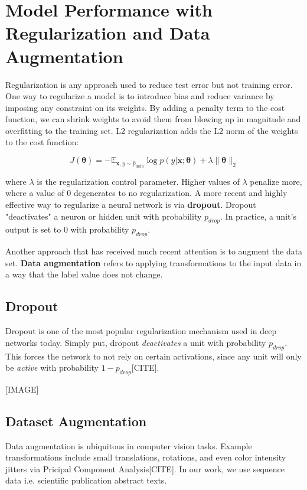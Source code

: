 
\chapter{Model Performance with Regularization and Data Augmentation}

Regularization is any approach used to reduce test error but not training error. One way
to regularize a model is to introduce bias and reduce variance by imposing any constraint on
its weights. By adding a penalty term to the cost function, we can shrink weights to avoid
them from blowing up in magnitude and overfitting to the training set. L2 regularization
adds the L2 norm of the weights to the cost function:

\[J(\bm{\theta}) = -\mathbb{E}_{\bm{x},y \sim \hat p_{data}} \log \textit{p}(y|\bm{x};\bm{\theta}) + \lambda \lVert \bm{\theta} \rVert_{2}\]

where $\lambda$ is the regularization control parameter. Higher values of $\lambda$ penalize more, where
a value of 0 degenerates to no regularization.
A more recent and highly effective way to regularize a neural network is via \textbf{dropout}.
Dropout "deactivates" a neuron or hidden unit with probability $p_{drop}$. In practice, a unit’s
output is set to 0 with probability $p_{drop}$.

Another approach that has received much recent attention is to augment the data set.
\textbf{Data augmentation} refers to applying transformations to the input data in a way that
the label value does not change.


\section{Dropout}
Dropout is one of the most popular regularization mechanism used in deep networks today.
Simply put, dropout \textit{deactivates} a unit with probability $p_{drop}$. This forces the network to not rely on certain
activations, since any unit will only be \textit{active} with probability $1-p_{drop}$[CITE].

[IMAGE]

\section{Dataset Augmentation}
Data augmentation is ubiquitous in computer vision tasks. Example transformations include
small translations, rotations, and even color intensity jitters via Pricipal Component
Analysis[CITE]. In our work, we use sequence data i.e. scientific publication abstract texts.

